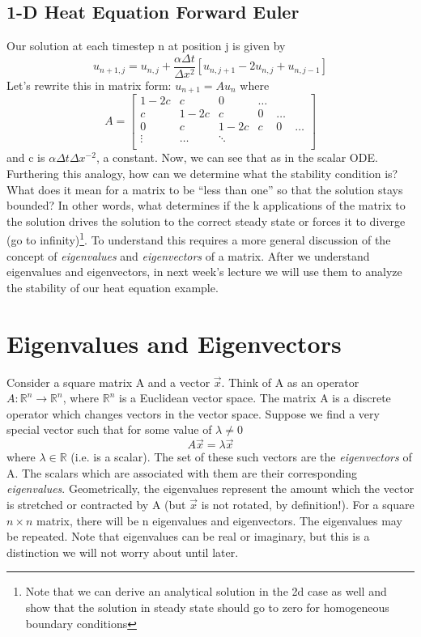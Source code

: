 \documentclass[11pt]{article}
\begin{document}
\subsection{ 1-D Heat Equation Forward Euler}
Our solution at each timestep n at position j is given by
$$u_{n+1,j} = u_{n,j} + \frac{\alpha \Delta t}{\Delta x^2} [u_{n,j+1} - 2u_{n,j} + u_{n,j-1} ]$$
Let's rewrite this in matrix form: $u_{n+1} = Au_n$ where 
\begin{equation}
A = \begin{bmatrix}
1-2c & c & 0 &  \ldots \\
c & 1-2c & c & 0 & \ldots \\
0 & c & 1-2c & c & 0 & \ldots \\
\vdots & \ldots & \ddots \\
\end{bmatrix}
\end{equation}
and c is $\alpha \Delta t \Delta x^{-2}$, a constant. Now, we can see that  as in the scalar ODE. Furthering this analogy, how can we determine what the stability condition is? What does it mean for a matrix to be ``less than one'' so that the solution stays bounded? In other words, what determines if the k applications of the matrix to the solution
drives the solution to the correct steady state or forces it to diverge (go to infinity)\footnote{Note that we can derive an analytical solution in the 2d case as well and show that the solution
in steady state should go to zero for homogeneous boundary conditions}. To understand this requires a more general discussion of the concept of {\em eigenvalues} and {\em eigenvectors} of a matrix. After we understand eigenvalues and eigenvectors, in next week's lecture we will use them to analyze the stability of our heat equation example.

\section{Eigenvalues and Eigenvectors}
Consider a square matrix A and a vector $\vec{x}$. Think of A as an operator $A \colon \mathbb{R}^n \to \mathbb{R}^n$, where $\mathbb{R}^{n}$ is a Euclidean vector space. The matrix A is a discrete operator which changes vectors in the vector space. Suppose we find a very special vector such that for some value of $\lambda \neq  0$ 
\begin{equation}
A\vec{x} = \lambda \vec{x}
\label{eqn:eig}
\end{equation}
where $\lambda \in \mathbb{R}$ (i.e. is a scalar). The set of these such vectors are the \emph{eigenvectors} of A. The scalars which are associated with them are their corresponding \emph{eigenvalues}. Geometrically, the eigenvalues represent the amount which the vector is stretched or contracted by A (but $\vec{x}$ is not rotated, by definition!). For a square $n \times n$ matrix, there will be n eigenvalues and eigenvectors. The eigenvalues may be repeated. Note that eigenvalues can be real or imaginary, but this is a distinction we will not worry about until later.
\end{document}
